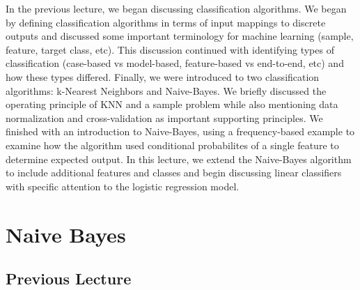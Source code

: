 \documentclass{article}
\begin{document}
In the previous lecture, we began discussing classification algorithms. We began by defining classification algorithms in terms of input mappings to discrete outputs and discussed some important terminology for machine learning (sample, feature, target class, etc). This discussion continued with identifying types of classification (case-based vs model-based, feature-based vs end-to-end, etc) and how these types differed. Finally, we were introduced to two classification algorithms: k-Nearest Neighbors and Naive-Bayes. We briefly discussed the operating principle of KNN and a sample problem while also mentioning data normalization and cross-validation as important supporting principles. We finished with an introduction to Naive-Bayes, using a frequency-based example to examine how the algorithm used conditional probabilites of a single feature to determine expected output. In this lecture, we extend the Naive-Bayes algorithm to include additional features and classes and begin discussing linear classifiers with specific attention to the logistic regression model.  

\section{Naive Bayes} 

\subsection{Previous Lecture}
\end{document}
